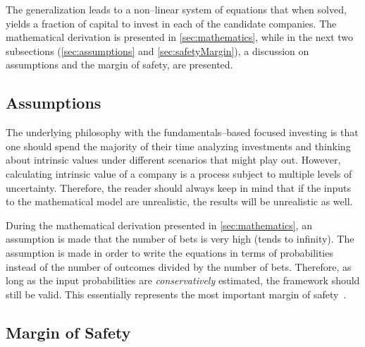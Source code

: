 \documentclass{article}
\begin{document}
The generalization leads to a non--linear system of equations that when solved,
yields a fraction of capital to invest in each of the candidate companies. The
mathematical derivation is presented in \autoref{sec:mathematics}, while in the
next two subsections (\autoref{sec:assumptions} and \autoref{sec:safetyMargin}),
a discussion on assumptions and the margin of safety, are presented.

\subsection{Assumptions}
\label{sec:assumptions}

The underlying philosophy with the fundamentals--based focused investing is that
one should spend the majority of their time analyzing investments and thinking
about intrinsic values under different scenarios that might play out. However,
calculating intrinsic value of a company is a process subject to multiple levels
of uncertainty. Therefore, the reader should always keep in mind that if the
inputs to the mathematical model are unrealistic, the results will be
unrealistic as well.

During the mathematical derivation presented in \autoref{sec:mathematics}, an
assumption is made that the number of bets is very high (tends to infinity).
The assumption is made in order to write the equations in terms of probabilities
instead of the number of outcomes divided by the number of bets. Therefore, as
long as the input probabilities are \textit{conservatively} estimated, the
framework should still be valid. This essentially represents the most important
margin of safety~\cite{intelligentInvestor}.

\subsection{Margin of Safety}
\label{sec:safetyMargin}
\end{document}
